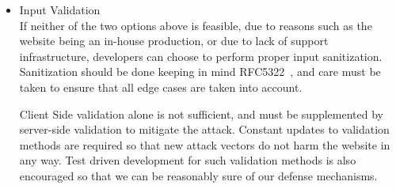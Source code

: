 \begin{itemize}
	\item Input Validation\\
	If neither of the two options above is feasible, due to reasons such as the website being an in-house production, or due to lack of support infrastructure, developers can choose to perform proper input sanitization. Sanitization should be done keeping in mind RFC5322~\cite{rfc5322}, and care must be taken to ensure that all edge cases are taken into account.
	
	Client Side validation alone is not sufficient, and must be supplemented by server-side validation to mitigate the attack. Constant updates to validation methods are required so that new attack vectors do not harm the website in any way.
	Test driven development for such validation methods is also encouraged so that we can be reasonably sure of our defense mechanisms.
\end{itemize}

